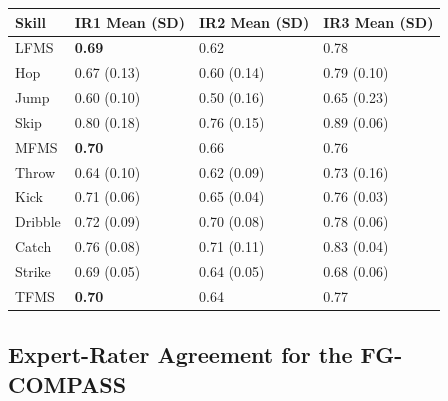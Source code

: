 \documentclass[
  man,
  colorlinks=true,linkcolor=blue,citecolor=blue,urlcolor=blue]{apa7}
\begin{document}
\newpage{}

\begin{table}
\caption{Summary of Quadratic Weighted Kappa for Intra-Rater Comparisons Across Motor Skills}
\label{apatb-table4}

\begin{longtable}[]{@{}llll@{}}
\toprule\noalign{}
Skill & IR1 Mean (SD) & IR2 Mean (SD) & IR3 Mean (SD) \\
\midrule\noalign{}
\endhead
\bottomrule\noalign{}
\endlastfoot
LFMS & \textbf{0.69} & 0.62 & 0.78 \\
Hop & 0.67 (0.13) & 0.60 (0.14) & 0.79 (0.10) \\
Jump & 0.60 (0.10) & 0.50 (0.16) & 0.65 (0.23) \\
Skip & 0.80 (0.18) & 0.76 (0.15) & 0.89 (0.06) \\
MFMS & \textbf{0.70} & 0.66 & 0.76 \\
Throw & 0.64 (0.10) & 0.62 (0.09) & 0.73 (0.16) \\
Kick & 0.71 (0.06) & 0.65 (0.04) & 0.76 (0.03) \\
Dribble & 0.72 (0.09) & 0.70 (0.08) & 0.78 (0.06) \\
Catch & 0.76 (0.08) & 0.71 (0.11) & 0.83 (0.04) \\
Strike & 0.69 (0.05) & 0.64 (0.05) & 0.68 (0.06) \\
TFMS & \textbf{0.70} & 0.64 & 0.77 \\
\end{longtable}


\end{table}

\hypertarget{expert-rater-agreement-for-the-fg-compass}{%
\subsection{Expert-Rater Agreement for the
FG-COMPASS}\label{expert-rater-agreement-for-the-fg-compass}}
\end{document}

